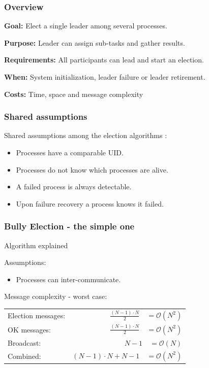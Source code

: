 \documentclass[10pt]{beamer}
\begin{document}
\begin{frame}
  \frametitle{Overview}
  \textbf{Goal:} Elect a single leader among several processes.

  \textbf{Purpose:} Leader can assign sub-tasks and gather results.

  \textbf{Requirements:} All participants can lead and start an election.

  \textbf{When:} System initialization, leader failure or leader retirement.

  \textbf{Costs:} Time, space and message complexity
\end{frame}

\begin{frame}
  \frametitle{Shared assumptions}
  Shared assumptions among the election algorithms  \cite{pedersenLeaderElectionDistributed2022}:
  \begin{itemize}
    \item Processes have a comparable UID.
    \item Processes do not know which processes are alive.
    \item A failed process is always detectable.
    \item Upon failure recovery a process knows it failed.
  \end{itemize}
\end{frame}

\begin{frame}
  \frametitle{Bully Election - the simple one}
  Algorithm explained

  Assumptions:
  \begin{itemize}
    \item Processes can inter-communicate.
  \end{itemize}

  \vspace*{2em}
  \centering
  Message complexity - worst case:
  \begin{table}
    \begin{tabular}{@{} lr @{}}
      \toprule
      Election messages: & $\frac{(N-1)\cdot N}{2} \quad = \mathcal{O}(N^2)$ \\ 
      OK messages: & $\frac{(N-1)\cdot N}{2} \quad = \mathcal{O}(N^2)$ \\ 
      Broadcast: & $N-1 \quad = \mathcal{O}(N)$ \\
      Combined: & $(N-1)\cdot N + N - 1 \quad = \mathcal{O}(N^2)$\\
      \bottomrule
    \end{tabular}
  \end{table}
\end{frame}
\end{document}
